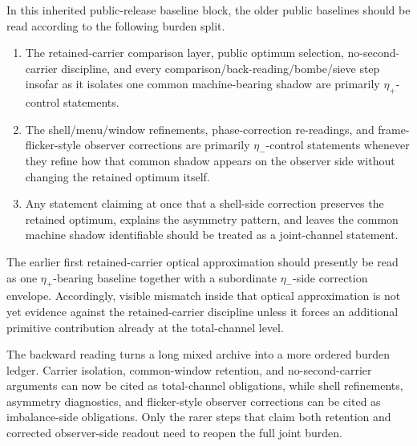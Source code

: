 \begin{proposition}
In this inherited public-release baseline block, the older public baselines should be read according to the following burden split.
\begin{enumerate}[leftmargin=2em]
  \item The retained-carrier comparison layer, public optimum selection, no-second-carrier discipline, and every comparison/back-reading/bombe/sieve step insofar as it isolates one common machine-bearing shadow are primarily \(\eta_+\)-control statements.
  \item The shell/menu/window refinements, phase-correction re-readings, and frame-flicker-style observer corrections are primarily \(\eta_-\)-control statements whenever they refine how that common shadow appears on the observer side without changing the retained optimum itself.
  \item Any statement claiming at once that a shell-side correction preserves the retained optimum, explains the asymmetry pattern, and leaves the common machine shadow identifiable should be treated as a joint-channel statement.
\end{enumerate}
\end{proposition}

\begin{corollary}
The earlier first retained-carrier optical approximation should presently be read as one \(\eta_+\)-bearing baseline together with a subordinate \(\eta_-\)-side correction envelope. Accordingly, visible mismatch inside that optical approximation is not yet evidence against the retained-carrier discipline unless it forces an additional primitive contribution already at the total-channel level.
\end{corollary}

\begin{remark}
The backward reading turns a long mixed archive into a more ordered burden ledger. Carrier isolation, common-window retention, and no-second-carrier arguments can now be cited as total-channel obligations, while shell refinements, asymmetry diagnostics, and flicker-style observer corrections can be cited as imbalance-side obligations. Only the rarer steps that claim both retention and corrected observer-side readout need to reopen the full joint burden.
\end{remark}


